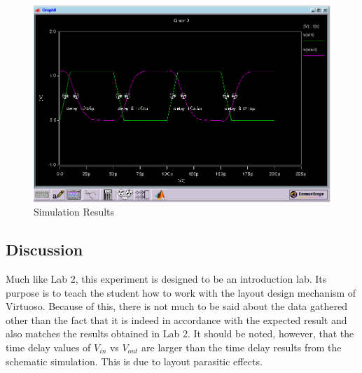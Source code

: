 \documentclass[12pt]{article}
\begin{document}
\begin{figure}[H]
\centering
\includegraphics[width=1\linewidth]{graph}
\caption{Simulation Results}
\label{fig:graph}
\end{figure}



\subsection{Discussion}
Much like Lab 2, this experiment is designed to be an introduction lab. Its purpose is to teach the student how to work with the layout design mechanism of Virtuoso. Because of this, there is not much to be said about the data gathered other than the fact that it is indeed in accordance with the expected result and also matches the results obtained in Lab 2. It should be noted, however, that the time delay values of $V_{in}$ vs $V_{out}$ are larger than the time delay results from the schematic simulation. This is due to layout parasitic effects.
\end{document}

